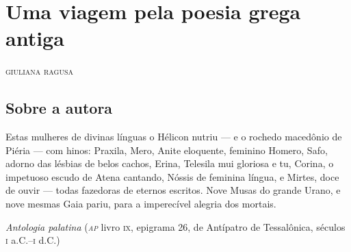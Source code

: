 \chapter[Uma viagem pela poesia grega antiga, \emph{por Giuliana Ragusa}]{Uma viagem pela poesia grega antiga}

\begin{flushright}
\textsc{giuliana ragusa}
\end{flushright}

\section{Sobre a autora}

\epigraph{Estas mulheres de divinas línguas o Hélicon nutriu --- e o  %
rochedo macedônio de Piéria --- com hinos: %
Praxila, Mero, Anite eloquente, feminino Homero, %
Safo, adorno das lésbias de belos cachos, %
Erina, Telesila mui gloriosa e tu, Corina, %
o impetuoso escudo de Atena cantando, %
Nóssis de feminina língua, e Mirtes, doce de ouvir ---  %
todas fazedoras de eternos escritos. %
Nove Musas do grande Urano, e nove mesmas %
Gaia pariu, para a imperecível alegria dos mortais.}
{\textit{Antologia palatina} (\textit{\textsc{ap}} livro \textsc{ix}, epigrama 26, de Antípatro de Tessalônica,
séculos \textsc{i} a.C.--\textsc{i} d.C.)\footnotemark}


